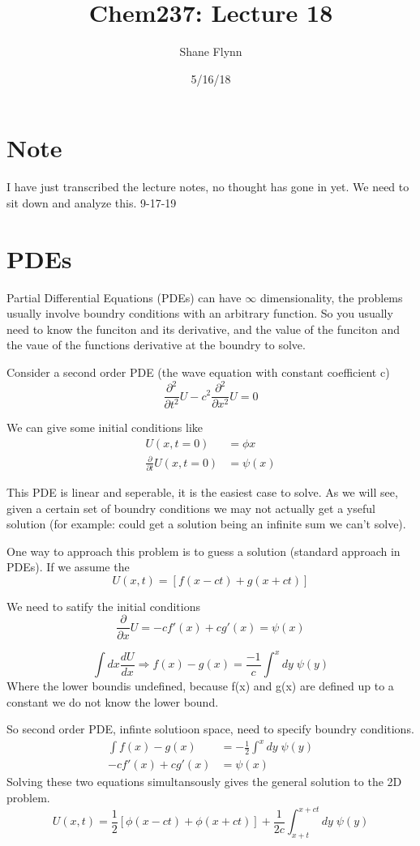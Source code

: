 \documentclass{article}
\title{Chem237: Lecture 18}
\date{5/16/18}
\author{Shane Flynn}
\newcommand{\be}{\begin{equation}}
\newcommand{\ee}{\end{equation}}
\newcommand{\pd}{\partial}
\newcommand{\half}{\frac{1}{2}}
\newcommand{\prt}{\frac{\pd}{\pd t}}
\newcommand{\prts}{\frac{\pd^2}{\pd t^2}}
\newcommand{\prx}{\frac{\pd}{\pd x}}
\newcommand{\prxs}{\frac{\pd^2}{\pd x^2}}
\begin{document}
\maketitle

\section{Note}
I have just transcribed the lecture notes, no thought has gone in yet. We need to sit down and analyze this. 9-17-19

\section{PDEs}
Partial Differential Equations (PDEs) can have $\infty$ dimensionality, the problems usually involve boundry conditions with an arbitrary function. 
So you usually need to know the funciton and its derivative, and the value of the funciton and the vaue of the functions derivative at the boundry to solve. 

Consider a second order PDE (the wave equation with constant coefficient c)
\be
\prts U - c^2 \prxs U = 0 
\ee

We can give some initial conditions like 
\be
\begin{split}
    U(x,t=0) &= \phi x\\
    \prt U (x,t=0) &= \psi(x)
\end{split}
\ee

This PDE is linear and seperable, it is the easiest case to solve.
As we will see, given a certain set of boundry conditions we may not actually get a yseful solution (for example: could get a solution being an infinite sum we can't solve). 

One way to approach this problem is to guess a solution (standard approach in PDEs). 
If we assume the 
\be
U(x,t)=\left[f(x-ct)+g(x+ct)\right]
\ee

We need to satify the initial conditions
\be
\prx U = -cf'(x)+cg'(x) = \psi(x)
\ee

\be
\int dx \frac{dU}{dx} \Rightarrow f(x) - g(x) = \frac{-1}{c} \int^x dy\;\psi(y)
\ee
Where the lower boundis undefined, because f(x) and g(x) are defined up to a constant we do not know the lower bound. 

So second order PDE, infinte solutioon space, need to specify boundry conditions. 
\be\begin{split}
    \int f(x) - g(x) &=-\half\int^x dy\;\psi(y) \\
    -cf'(x) + cg'(x) &= \psi(x)
\end{split}
\ee
Solving these two equations simultansously gives the general solution to the 2D problem. 
\be
U(x,t) = \half\left[\phi(x-ct)+\phi(x+ct)\right] + \frac{1}{2c} \int_{x+t}^{x+ct} dy \; \psi(y) 
\ee
\end{document}
